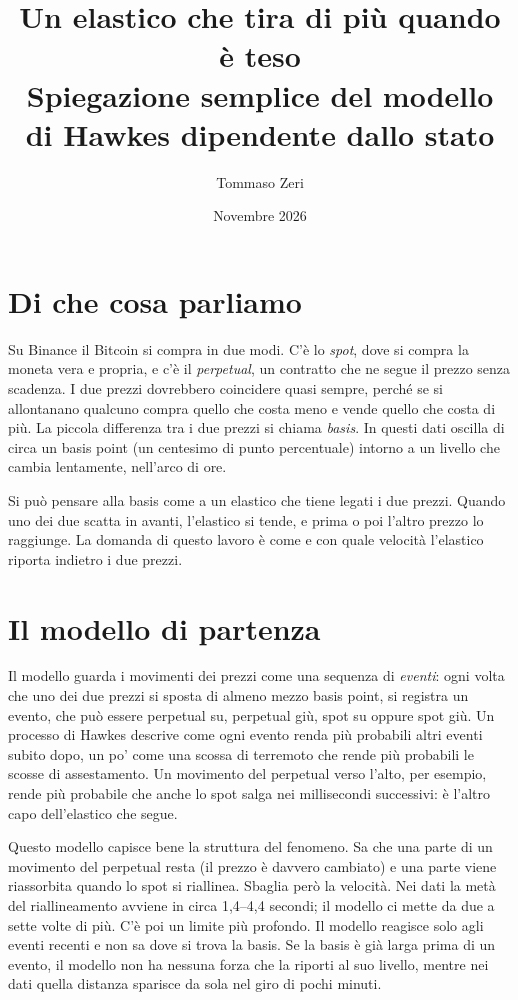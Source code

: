 \documentclass[a4paper,11pt]{article}
\title{Un elastico che tira di più quando è teso\\[0.3em] \large Spiegazione semplice del modello di Hawkes dipendente dallo stato}
\author{Tommaso Zeri}
\date{Novembre 2026}
\begin{document}
\maketitle

\section*{Di che cosa parliamo}

Su Binance il Bitcoin si compra in due modi. C'è lo \emph{spot}, dove si compra la moneta vera e propria, e c'è il \emph{perpetual}, un contratto che ne segue il prezzo senza scadenza. I due prezzi dovrebbero coincidere quasi sempre, perché se si allontanano qualcuno compra quello che costa meno e vende quello che costa di più. La piccola differenza tra i due prezzi si chiama \emph{basis}. In questi dati oscilla di circa un basis point (un centesimo di punto percentuale) intorno a un livello che cambia lentamente, nell'arco di ore.

Si può pensare alla basis come a un elastico che tiene legati i due prezzi. Quando uno dei due scatta in avanti, l'elastico si tende, e prima o poi l'altro prezzo lo raggiunge. La domanda di questo lavoro è come e con quale velocità l'elastico riporta indietro i due prezzi.

\section*{Il modello di partenza}

Il modello guarda i movimenti dei prezzi come una sequenza di \emph{eventi}: ogni volta che uno dei due prezzi si sposta di almeno mezzo basis point, si registra un evento, che può essere perpetual su, perpetual giù, spot su oppure spot giù. Un processo di Hawkes descrive come ogni evento renda più probabili altri eventi subito dopo, un po' come una scossa di terremoto che rende più probabili le scosse di assestamento. Un movimento del perpetual verso l'alto, per esempio, rende più probabile che anche lo spot salga nei millisecondi successivi: è l'altro capo dell'elastico che segue.

Questo modello capisce bene la struttura del fenomeno. Sa che una parte di un movimento del perpetual resta (il prezzo è davvero cambiato) e una parte viene riassorbita quando lo spot si riallinea. Sbaglia però la velocità. Nei dati la metà del riallineamento avviene in circa 1,4--4,4 secondi; il modello ci mette da due a sette volte di più. C'è poi un limite più profondo. Il modello reagisce solo agli eventi recenti e non sa dove si trova la basis. Se la basis è già larga prima di un evento, il modello non ha nessuna forza che la riporti al suo livello, mentre nei dati quella distanza sparisce da sola nel giro di pochi minuti.
\end{document}
